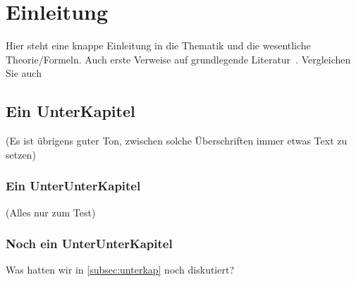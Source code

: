 \section{Einleitung}\label{sec:einleitung}
Hier steht eine knappe Einleitung in die Thematik und die wesentliche
Theorie/Formeln.
Auch erste Verweise auf grundlegende Literatur~\cite{SternGerlach}.
Vergleichen Sie auch~\cite{wissarbeit}

\subsection{Ein UnterKapitel} \label{subsec:unterkap}
(Es ist \"ubrigens guter Ton, zwischen solche \"Uberschriften immer etwas Text
zu setzen)
\subsubsection{Ein UnterUnterKapitel}
(Alles nur zum Test)
\subsubsection{Noch ein UnterUnterKapitel}
\label{subsubsec:unterunterkap}

Was hatten wir in \autoref{subsec:unterkap} noch diskutiert?